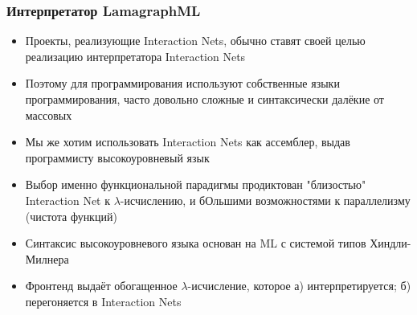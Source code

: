 \documentclass[aspectratio=169]{beamer}
\begin{document}
\begin{frame}
    \frametitle{Интерпретатор LamagraphML}

    \begin{itemize}
        \item Проекты, реализующие Interaction Nets, обычно ставят своей целью реализацию интерпретатора Interaction Nets
        \item Поэтому для программирования используют собственные языки программирования, часто довольно сложные и синтаксически далёкие от массовых
        \item Мы же хотим использовать Interaction Nets как ассемблер, выдав программисту высокоуровневый язык
        \item Выбор именно функциональной парадигмы продиктован "близостью" Interaction Net к $\lambda$-исчислению, и бОльшими возможностями к параллелизму (чистота функций)
        \item Синтаксис высокоуровневого языка основан на ML с системой типов Хиндли-Милнера
        \item Фронтенд выдаёт обогащенное $\lambda$-исчисление, которое а) интерпретируется; б) перегоняется в Interaction Nets
    \end{itemize}

\end{frame}
\end{document}
